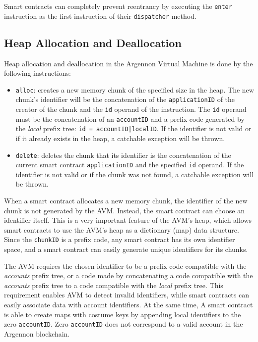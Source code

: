 Smart contracts can completely prevent reentrancy by executing the \texttt{enter} instruction as the first instruction
of their \texttt{dispatcher} method.

\subsection{Heap Allocation and Deallocation}\label{subsec:heap-allocation-instructions}

Heap allocation and deallocation in the Argennon Virtual Machine is done by the following instructions:

\begin{itemize}
    \item \texttt{alloc}: creates a new memory chunk of the specified size in the heap. The
    new chunk's identifier will be the concatenation of the \texttt{applicationID} of the creator of the chunk and
    the \texttt{id} operand of the instruction. The \texttt{id} operand must be the concatenation of
    an \texttt{accountID} and a prefix code
    generated by the \emph{local} prefix tree: \texttt{id = accountID|localID}. If the identifier is not valid or
    if it already exists in the heap, a catchable exception will be thrown.

    \item \texttt{delete}: deletes the chunk that its identifier is the concatenation of the current smart
    contract \texttt{applicationID} and the specified \texttt{id} operand. If the identifier is not valid or
    if the chunk was not found, a catchable exception will be thrown.
\end{itemize}

When a smart contract allocates a new memory chunk, the identifier of the new chunk is not generated by
the AVM. Instead, the smart contract can choose an identifier itself. This is a very important feature of
the AVM's heap, which allows smart contracts to use the AVM's heap as a dictionary (map) data structure.
Since the \texttt{chunkID} is a prefix code, any smart contract has its own identifier space, and a smart contract
can easily generate unique identifiers for its chunks.

The AVM requires the chosen identifier to be a prefix code compatible with
the \emph{accounts} prefix tree, or a code made by concatenating a code compatible with
the \emph{accounts} prefix tree to a code compatible with the \emph{local} prefix tree. This requirement
enables AVM to detect invalid identifiers, while smart contracts can easily associate data with account identifiers.
At the same time, A smart contract is able to create maps with costume keys by appending local identifiers
to the zero \texttt{accountID}. Zero \texttt{accountID} does not correspond to a valid account in the Argennon
blockchain.


